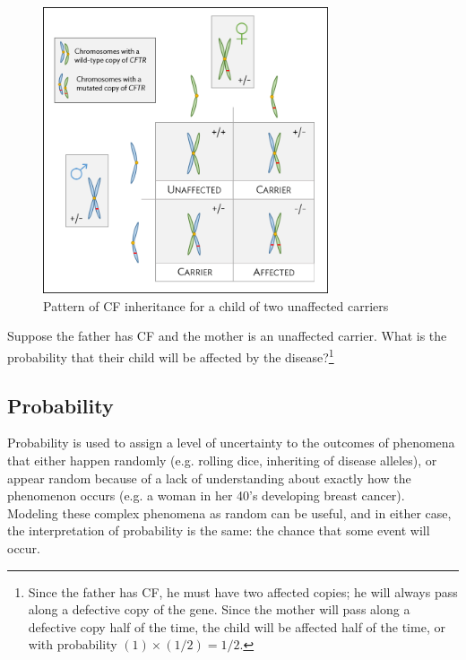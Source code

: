 \begin{figure}[h!]
	\centering
	\includegraphics[width= 0.75\textwidth]{ch_probability_oi_biostat/figures/cfInheritance/cfInheritance.png}
	\caption{Pattern of CF inheritance for a child of two unaffected carriers}
	\label{fig:cfInheritance}
\end{figure}

\begin{exercise}
Suppose the father has CF and the mother is an unaffected carrier. What is the probability that their child will be affected by the disease?\footnote{Since the father has CF, he must have two affected copies; he will always pass along a defective copy of the gene.  Since the mother will pass along a defective copy half of the time, the child will be affected half of the time, or with probability $(1) \times (1/2) = 1/2$.}
\end{exercise}

\subsection{Probability}


Probability is used to assign a level of uncertainty to the outcomes of phenomena that either happen randomly (e.g. rolling dice, inheriting of disease alleles), or appear random because of a lack of understanding about exactly how the phenomenon occurs (e.g. a woman in her 40's developing breast cancer). Modeling these complex phenomena as random can be useful, and in either case, the interpretation of probability is the same: the chance that some event will occur.

